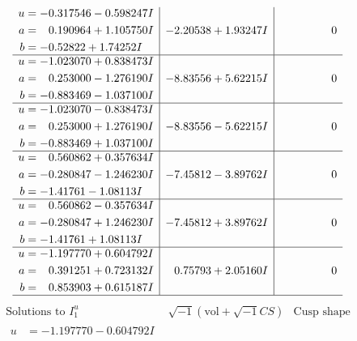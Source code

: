 \documentclass[1p]{elsarticle_modified}
\theoremstyle{definition}
\newcommand{\I}{\sqrt{-1}}
\begin{document}
$$\begin{array}{c|c|c}
\begin{aligned}
u &= -0.317546 - 0.598247 I \\
a &= \phantom{-}0.190964 + 1.105750 I \\
b &= -0.52822 + 1.74252 I\end{aligned}
 & -2.20538 + 1.93247 I & \phantom{-0.000000 } 0 \\ \hline\begin{aligned}
u &= -1.023070 + 0.838473 I \\
a &= \phantom{-}0.253000 - 1.276190 I \\
b &= -0.883469 - 1.037100 I\end{aligned}
 & -8.83556 + 5.62215 I & \phantom{-0.000000 } 0 \\ \hline\begin{aligned}
u &= -1.023070 - 0.838473 I \\
a &= \phantom{-}0.253000 + 1.276190 I \\
b &= -0.883469 + 1.037100 I\end{aligned}
 & -8.83556 - 5.62215 I & \phantom{-0.000000 } 0 \\ \hline\begin{aligned}
u &= \phantom{-}0.560862 + 0.357634 I \\
a &= -0.280847 - 1.246230 I \\
b &= -1.41761 - 1.08113 I\end{aligned}
 & -7.45812 - 3.89762 I & \phantom{-0.000000 } 0 \\ \hline\begin{aligned}
u &= \phantom{-}0.560862 - 0.357634 I \\
a &= -0.280847 + 1.246230 I \\
b &= -1.41761 + 1.08113 I\end{aligned}
 & -7.45812 + 3.89762 I & \phantom{-0.000000 } 0 \\ \hline\begin{aligned}
u &= -1.197770 + 0.604792 I \\
a &= \phantom{-}0.391251 + 0.723132 I \\
b &= \phantom{-}0.853903 + 0.615187 I\end{aligned}
 & \phantom{-}0.75793 + 2.05160 I & \phantom{-0.000000 } 0\\
 \hline 
 \end{array}$$\newpage$$\begin{array}{c|c|c}  
\text{Solutions to }I^u_{1}& \I (\text{vol} + \sqrt{-1}CS) & \text{Cusp shape}\\
 \hline 
\begin{aligned}
u &= -1.197770 - 0.604792 I \\

\end{aligned}
\end{array}$$
\end{document}
